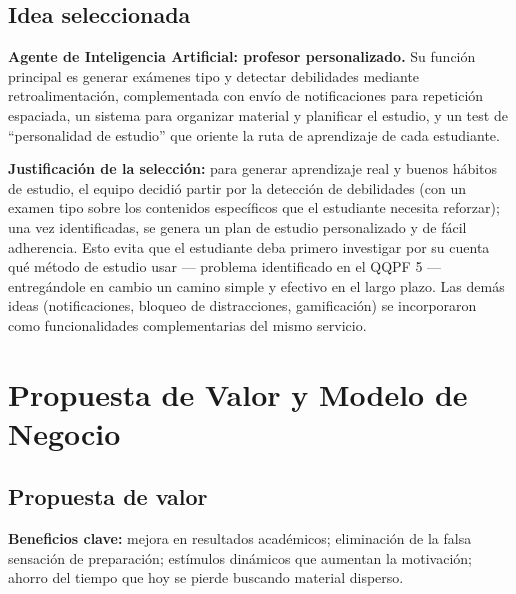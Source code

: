 \documentclass[11pt,a4paper]{article}
\begin{document}
\subsection{Idea seleccionada}

\textbf{Agente de Inteligencia Artificial: profesor personalizado.} Su funci\'on principal es generar ex\'amenes tipo y detectar debilidades mediante retroalimentaci\'on, complementada con env\'io de notificaciones para repetici\'on espaciada, un sistema para organizar material y planificar el estudio, y un test de ``personalidad de estudio'' que oriente la ruta de aprendizaje de cada estudiante.

\textbf{Justificaci\'on de la selecci\'on:} para generar aprendizaje real y buenos h\'abitos de estudio, el equipo decidi\'o partir por la detecci\'on de debilidades (con un examen tipo sobre los contenidos espec\'ificos que el estudiante necesita reforzar); una vez identificadas, se genera un plan de estudio personalizado y de f\'acil adherencia. Esto evita que el estudiante deba primero investigar por su cuenta qu\'e m\'etodo de estudio usar --- problema identificado en el QQPF 5 --- entreg\'andole en cambio un camino simple y efectivo en el largo plazo. Las dem\'as ideas (notificaciones, bloqueo de distracciones, gamificaci\'on) se incorporaron como funcionalidades complementarias del mismo servicio.

\section{Propuesta de Valor y Modelo de Negocio}

\subsection{Propuesta de valor}

\begin{center}
\end{center}

\noindent\textbf{Beneficios clave:} mejora en resultados acad\'emicos; eliminaci\'on de la falsa sensaci\'on de preparaci\'on; est\'imulos din\'amicos que aumentan la motivaci\'on; ahorro del tiempo que hoy se pierde buscando material disperso.
\end{document}
